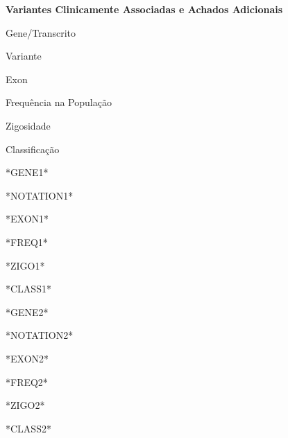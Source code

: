\documentclass[12pt]{article}
\newcommand{\fakehline}[1][]{\begin{rulerbox}[#1] \end{rulerbox}}
\begin{document}
{\selectfont{} \color{coolblack}\normalsize \bfseries Variantes Clinicamente Associadas e Achados Adicionais}
\begin{center}
\begin{tcbraster}[raster columns=6,raster column skip = -0.5pt, raster row skip = 0pt]
\begin{tableheaderbox} Gene/Transcrito \end{tableheaderbox} \begin{tableheaderbox} Variante \end{tableheaderbox} 
\begin{tableheaderbox} Exon \end{tableheaderbox} \begin{tableheaderbox} Frequência na População \end{tableheaderbox} \begin{tableheaderbox} Zigosidade \end{tableheaderbox} \begin{tableheaderbox} Classificação \end{tableheaderbox} 


\begin{contentbox} *GENE1* \end{contentbox} \begin{contentbox} *NOTATION1* \end{contentbox}
\begin{contentbox} *EXON1* \end{contentbox} \begin{contentbox} *FREQ1* \end{contentbox} \begin{contentbox} *ZIGO1* \end{contentbox} \begin{contentbox} *CLASS1* \end{contentbox}
\fakehline\fakehline\fakehline\fakehline\fakehline\fakehline

\begin{contentbox} *GENE2* \end{contentbox} \begin{contentbox} *NOTATION2* \end{contentbox}
\begin{contentbox} *EXON2* \end{contentbox} \begin{contentbox} *FREQ2* \end{contentbox} \begin{contentbox} *ZIGO2* \end{contentbox} \begin{contentbox} *CLASS2* \end{contentbox}
\fakehline\fakehline\fakehline\fakehline\fakehline\fakehline


\end{tcbraster}
\end{center}
\end{document}
